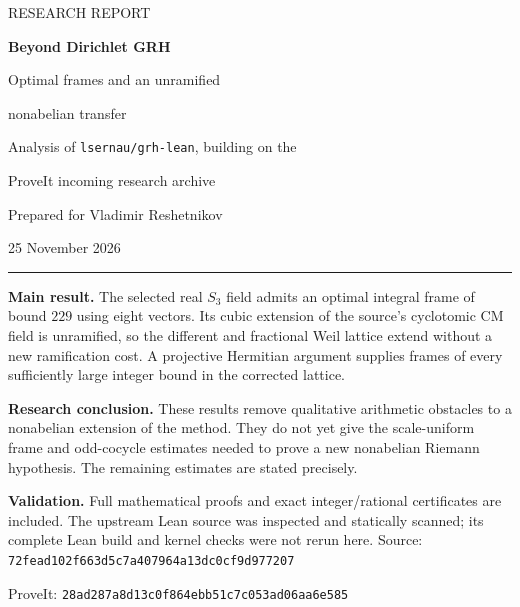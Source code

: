 \documentclass[11pt,letterpaper]{article}
\theoremstyle{definition}
\begin{document}
\begin{titlepage}
\vspace*{0.55in}
{\color{MidnightBlue}\large RESEARCH REPORT}\par
\vspace{0.25in}
{\Huge\bfseries Beyond Dirichlet GRH}\par
\vspace{0.16in}
{\LARGE Optimal frames and an unramified\par nonabelian transfer}\par
\vspace{0.35in}
{\large Analysis of \texttt{lsernau/grh-lean}, building on the\par ProveIt incoming research archive}\par
\vspace{0.35in}
Prepared for Vladimir Reshetnikov\par
25 November 2026\par
\vspace{0.45in}
\hrule
\vspace{0.18in}
\textbf{Main result.} The selected real $S_3$ field admits an optimal integral frame of bound $229$ using eight vectors. Its cubic extension of the source's cyclotomic CM field is unramified, so the different and fractional Weil lattice extend without a new ramification cost. A projective Hermitian argument supplies frames of every sufficiently large integer bound in the corrected lattice.

\textbf{Research conclusion.} These results remove qualitative arithmetic obstacles to a nonabelian extension of the method. They do not yet give the scale-uniform frame and odd-cocycle estimates needed to prove a new nonabelian Riemann hypothesis. The remaining estimates are stated precisely.

\textbf{Validation.} Full mathematical proofs and exact integer/rational certificates are included. The upstream Lean source was inspected and statically scanned; its complete Lean build and kernel checks were not rerun here.
\vfill
\small Source: \texttt{72fead102f663d5c7a407964a13dc0cf9d977207}\par
ProveIt: \texttt{28ad287a8d13c0f864ebb51c7c053ad06aa6e585}
\end{titlepage}
\begingroup
\small
\setlength{\parskip}{0pt}
\tableofcontents
\endgroup
\newpage







\end{document}
